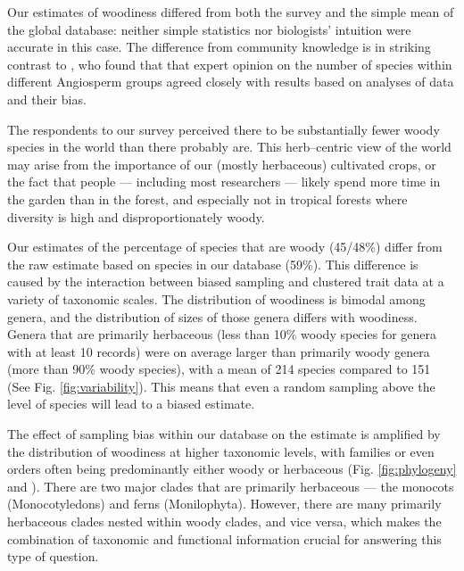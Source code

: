 \documentclass[a4paper,12pt]{article}
\begin{document}
Our estimates of woodiness differed from both the survey and the
simple mean of the global database: neither simple statistics nor
biologists' intuition were accurate in this case.  The difference from
community knowledge is in striking contrast to \citet{joppa2010}, who
found that that expert opinion on the number of species within
different Angiosperm groups agreed closely with results based on
analyses of data and their bias.

The respondents to our survey perceived there to be substantially
fewer woody species in the world than there probably are.  This
herb--centric view of the world may arise from the importance of our
(mostly herbaceous) cultivated crops, or the fact that people ---
including most researchers --- likely spend more time in the garden than in
the forest, and especially not in tropical forests where diversity is high and disproportionately woody.

Our estimates of the percentage of species that are woody (45/48\%)
differ from the raw estimate based on species in our database (59\%).
This difference is caused by the interaction between biased sampling
and clustered trait data at a variety of taxonomic scales.
The distribution of woodiness is bimodal among genera, and the
distribution of sizes of those genera differs with woodiness.  Genera
that are primarily herbaceous (less than 10\% woody species for genera
with at least 10 records) were on average larger than primarily woody
genera (more than 90\% woody species), with a mean of 214 species
compared to 151 (See Fig. \ref{fig:variability}).
This means that even a random sampling above the level of species will
lead to a biased estimate.

The effect of sampling bias within our database on the estimate is
amplified by the distribution of woodiness at higher taxonomic levels,
with families or even orders often being predominantly either woody or
herbaceous (Fig. \ref{fig:phylogeny} and
\citealt{sinnott1915evolution}).  There are two major clades that are
primarily herbaceous --- the monocots (Monocotyledons) and ferns
(Monilophyta). However, there are many primarily herbaceous clades
nested within woody clades, and vice versa, which makes the
combination of taxonomic and functional information crucial for
answering this type of question.
\end{document}
